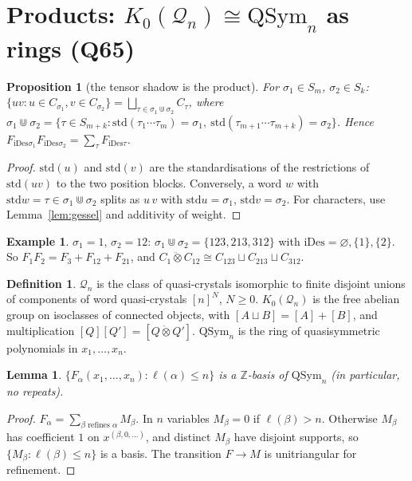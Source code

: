 \documentclass[11pt]{amsart}
\newtheorem{lemma}[theorem]{Lemma}
\newtheorem{proposition}[theorem]{Proposition}
\theoremstyle{definition}
\newtheorem{definition}[theorem]{Definition}
\newtheorem{example}[theorem]{Example}
\theoremstyle{remark}
\newcommand{\qt}{\mathbin{\ddot\otimes}}
\newcommand{\std}{\mathrm{std}}
\newcommand{\iDes}{\mathrm{iDes}}
\newcommand{\QSym}{\mathrm{QSym}}
\newcommand{\cQ}{\mathcal{Q}}
\begin{document}
\section{Products: $K_0(\cQ_n)\cong\QSym_n$ as rings (Q65)}

\begin{proposition}[the tensor shadow is the product]\label{prop:P}
For $\sigma_1\in S_m$, $\sigma_2\in S_k$: $\{uv:u\in C_{\sigma_1},v\in C_{\sigma_2}\}=\bigsqcup_{\tau\in\sigma_1\Cup\sigma_2}C_\tau$, where $\sigma_1\Cup\sigma_2=\{\tau\in S_{m+k}:\std(\tau_1\cdots\tau_m)=\sigma_1,\ \std(\tau_{m+1}\cdots\tau_{m+k})=\sigma_2\}$. Hence $F_{\iDes\sigma_1}F_{\iDes\sigma_2}=\sum_{\tau}F_{\iDes\tau}$.
\end{proposition}
\begin{proof}
$\std(u)$ and $\std(v)$ are the standardisations of the restrictions of $\std(uv)$ to the two position blocks. Conversely, a word $w$ with $\std w=\tau\in\sigma_1\Cup\sigma_2$ splits as $u\,v$ with $\std u=\sigma_1$, $\std v=\sigma_2$. For characters, use Lemma~\ref{lem:gessel} and additivity of weight.
\end{proof}

\begin{example}
$\sigma_1=1$, $\sigma_2=12$: $\sigma_1\Cup\sigma_2=\{123,213,312\}$ with $\iDes=\varnothing,\{1\},\{2\}$. So $F_1F_2=F_3+F_{12}+F_{21}$, and $C_{1}\qt C_{12}\cong C_{123}\sqcup C_{213}\sqcup C_{312}$.
\end{example}

\begin{definition}
$\cQ_n$ is the class of quasi-crystals isomorphic to finite disjoint unions of components of word quasi-crystals $[n]^N$, $N\ge0$. $K_0(\cQ_n)$ is the free abelian group on isoclasses of connected objects, with $[A\sqcup B]=[A]+[B]$, and multiplication $[Q][Q']=[Q\qt Q']$. $\QSym_n$ is the ring of quasisymmetric polynomials in $x_1,\dots,x_n$.
\end{definition}

\begin{lemma}\label{lem:basis}
$\{F_\alpha(x_1,\dots,x_n):\ell(\alpha)\le n\}$ is a $\mathbb Z$-basis of $\QSym_n$ (in particular, no repeats).
\end{lemma}
\begin{proof}
$F_\alpha=\sum_{\beta\text{ refines }\alpha}M_\beta$. In $n$ variables $M_\beta=0$ if $\ell(\beta)>n$. Otherwise $M_\beta$ has coefficient $1$ on $x^{(\beta,0,\dots)}$, and distinct $M_\beta$ have disjoint supports, so $\{M_\beta:\ell(\beta)\le n\}$ is a basis. The transition $F\to M$ is unitriangular for refinement.
\end{proof}
\end{document}
